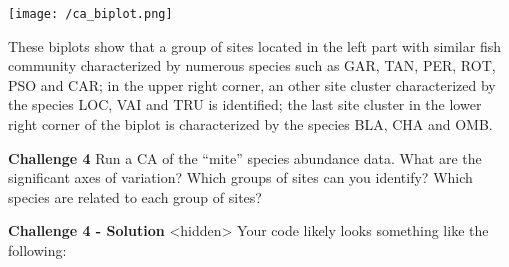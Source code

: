 \documentclass[
]{book}
\begin{document}
\texttt{[image: /ca\_biplot.png]}

These biplots show that a group of sites located in the left part with
similar fish community characterized by numerous species such as GAR,
TAN, PER, ROT, PSO and CAR; in the upper right corner, an other site
cluster characterized by the species LOC, VAI and TRU is identified; the
last site cluster in the lower right corner of the biplot is
characterized by the species BLA, CHA and OMB.

\textbf{Challenge 4} Run a CA of the ``mite'' species abundance data. What are
the significant axes of variation? Which groups of sites can you
identify? Which species are related to each group of sites?

\textbf{Challenge 4 - Solution} \textless hidden\textgreater{} Your code likely looks something
like the following:
\end{document}
